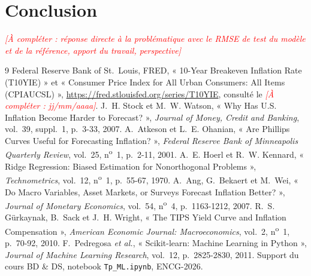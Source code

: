 \documentclass[11pt,a4paper]{article}
\newcounter{nbacompleter}
\DeclareRobustCommand{\acompleter}[1]{%
  \stepcounter{nbacompleter}\textcolor{red}{\textit{[À compléter : #1]}}}
\begin{document}
\section{Conclusion}
\label{sec:conclusion}
\acompleter{réponse directe à la problématique avec le RMSE de test du modèle et de la référence, apport du travail, perspective}

\begin{thebibliography}{9}
   Federal Reserve Bank of St.~Louis, FRED, « 10-Year Breakeven Inflation Rate (T10YIE) » et « Consumer Price Index for All Urban Consumers: All Items (CPIAUCSL) », \url{https://fred.stlouisfed.org/series/T10YIE}, consulté le \acompleter{jj/mm/aaaa}.
   J.~H. Stock et M.~W. Watson, « Why Has U.S. Inflation Become Harder to Forecast? », \textit{Journal of Money, Credit and Banking}, vol.~39, suppl.~1, p.~3-33, 2007.
   A.~Atkeson et L.~E. Ohanian, « Are Phillips Curves Useful for Forecasting Inflation? », \textit{Federal Reserve Bank of Minneapolis Quarterly Review}, vol.~25, n\textsuperscript{o}~1, p.~2-11, 2001.
   A.~E. Hoerl et R.~W. Kennard, « Ridge Regression: Biased Estimation for Nonorthogonal Problems », \textit{Technometrics}, vol.~12, n\textsuperscript{o}~1, p.~55-67, 1970.
   A.~Ang, G.~Bekaert et M.~Wei, « Do Macro Variables, Asset Markets, or Surveys Forecast Inflation Better? », \textit{Journal of Monetary Economics}, vol.~54, n\textsuperscript{o}~4, p.~1163-1212, 2007.
   R.~S. Gürkaynak, B.~Sack et J.~H. Wright, « The TIPS Yield Curve and Inflation Compensation », \textit{American Economic Journal: Macroeconomics}, vol.~2, n\textsuperscript{o}~1, p.~70-92, 2010.
   F.~Pedregosa \textit{et al.}, « Scikit-learn: Machine Learning in Python », \textit{Journal of Machine Learning Research}, vol.~12, p.~2825-2830, 2011.
   Support du cours BD \& DS, notebook \texttt{Tp\_ML.ipynb}, ENCG-2026.
\end{thebibliography}

\appendix
\end{document}
